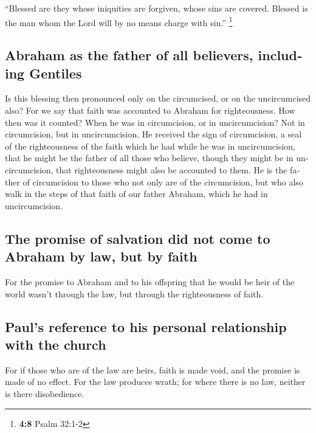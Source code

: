 \begin{paracol}{2}
\begin{otherlanguage}{english}
 ``Blessed are they whose iniquities are forgiven, whose
sins are covered.  Blessed is the man whom the Lord will
by no means charge with sin.'' \footnote{\textbf{4:8} Psalm 32:1-2}

\hypertarget{abraham-as-the-father-of-all-believers-including-gentiles}{%
\subsection{Abraham as the father of all believers, including
Gentiles}\label{abraham-as-the-father-of-all-believers-including-gentiles}}

 Is this blessing then pronounced only on the circumcised,
or on the uncircumcised also? For we say that faith was accounted to
Abraham for righteousness.  How then was it counted? When
he was in circumcision, or in uncircumcision? Not in circumcision, but
in uncircumcision.  He received the sign of circumcision,
a seal of the righteousness of the faith which he had while he was in
uncircumcision, that he might be the father of all those who believe,
though they might be in uncircumcision, that righteousness might also be
accounted to them.  He is the father of circumcision to
those who not only are of the circumcision, but who also walk in the
steps of that faith of our father Abraham, which he had in
uncircumcision.

\hypertarget{the-promise-of-salvation-did-not-come-to-abraham-by-law-but-by-faith}{%
\subsection{The promise of salvation did not come to Abraham by law, but
by
faith}\label{the-promise-of-salvation-did-not-come-to-abraham-by-law-but-by-faith}}

 For the promise to Abraham and to his offspring that he
would be heir of the world wasn't through the law, but through the
righteousness of faith.

\hypertarget{pauls-reference-to-his-personal-relationship-with-the-church}{%
\subsection{Paul's reference to his personal relationship with the
church}\label{pauls-reference-to-his-personal-relationship-with-the-church}}

 For if those who are of the law are heirs, faith is made
void, and the promise is made of no effect.  For the law
produces wrath; for where there is no law, neither is there
disobedience.


\end{otherlanguage}
\end{paracol}
